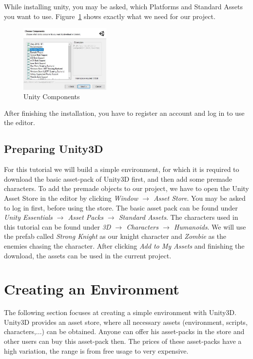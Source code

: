 \documentclass[12pt, a4paper, titlepage]{article}
\begin{document}
While installing unity, you may be asked, which Platforms and Standard Assets you want to use. Figure~\ref{fig:downloading_unity_components} shows exactly what we need for our project.

\begin{figure}[htbp]
  \centering
  \includegraphics[width=0.4\textwidth]{pictures/downloading_unity_components}
  \caption{Unity Components}
  \label{fig:downloading_unity_components}
\end{figure}

After finishing the installation, you have to register an account and log in to use the editor.

\subsection{Preparing Unity3D}
For this tutorial we will build a simple environment, for which it is required to download the basic asset-pack of Unity3D first, and then add some premade characters. To add the premade objects to our project, we have to open the Unity Asset Store in the editor by clicking \emph{Window $\rightarrow$ Asset Store}. You may be asked to log in first, before using the store.
The basic asset pack can be found under \emph{Unity Essentials $\rightarrow$ Asset Packs $\rightarrow$ Standard Assets}. The characters used in this tutorial can be found under \emph{3D $\rightarrow$ Characters $\rightarrow$ Humanoids}. We will use the prefab called \emph{Strong Knight} as our knight character and \emph{Zombie} as the enemies chasing the character.
After clicking \emph{Add to My Assets} and finishing the download, the assets can be used in the current project.

\section{Creating an Environment}

The following section focuses at creating a simple environment with Unity3D. 
Unity3D provides an asset store, where all necessary assets (environment, scripts, characters,...) can be obtained. Anyone can offer his asset-packs in the store and other users can buy this asset-pack then. The prices of these asset-packs have a high variation, the range is from free usage to very expensive. 
 
\end{document}
